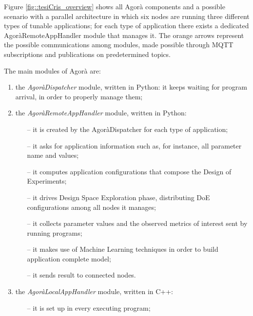 Figure \ref{fig::tesiCris_overview} shows all Agorà components and a possible scenario with a parallel architecture in which six nodes are running three different types of tunable applications; for each type of application there exists a dedicated AgoràRemoteAppHandler module that manages it. The orange arrows represent the possible communications among modules, made possible through MQTT subscriptions and publications on predetermined topics.

The main modules of Agorà are:

\begin{enumerate}

    \item the \textit{AgoràDispatcher} module, written in Python: it keeps waiting for program arrival, in order to properly manage them;
    
    \item the \textit{AgoràRemoteAppHandler} module, written in Python:
	\begin{itemize}	
		\item [--] it is created by the AgoràDispatcher for each type of application;

		\item [--] it asks for application information such as, for instance, all parameter name and values;

		\item [--] it computes application configurations that compose the Design of Experiments;

		\item [--] it drives Design Space Exploration phase, distributing DoE configurations among all nodes it manages;

		\item [--] it collects parameter values and the observed metrics of interest sent by running programs;

		\item [--] it makes use of Machine Learning techniques in order to build application complete model;

		\item [--] it sends result to connected nodes.
	\end{itemize}
    
    \item the \textit{AgoràLocalAppHandler} module, written in C++:
	\begin{itemize}
		\item [--] it is set up in every executing program;


\end{itemize}
\end{enumerate}
